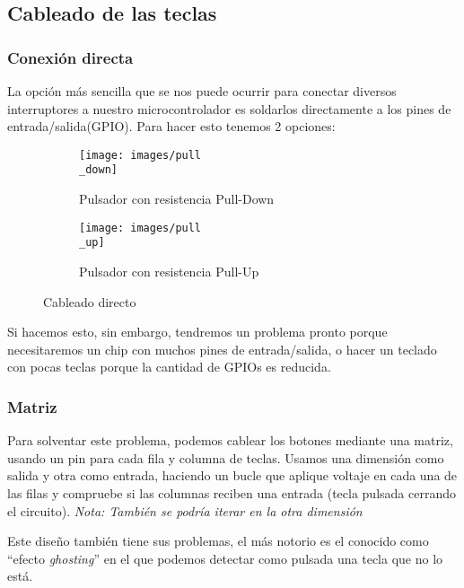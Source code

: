 \subsection{Cableado de las teclas}\label{sec:scanning}
    \subsubsection{Conexión directa}
    La opción más sencilla que se nos puede ocurrir para conectar diversos interruptores a nuestro microcontrolador es soldarlos directamente a los pines de entrada/salida(GPIO). Para hacer esto tenemos 2 opciones:
    \begin{figure}[H]
        \begin{subfigure}[b]{.5\textwidth}
          \centering
          \texttt{[image: images/pull\\\_down]}
          \caption{Pulsador con resistencia Pull-Down}
        \end{subfigure} 
        \hfill
        \begin{subfigure}[b]{.5\textwidth}
          \centering
          \texttt{[image: images/pull\\\_up]}
          \caption{Pulsador con resistencia Pull-Up}
        \end{subfigure}
        \caption{Cableado directo}
      \end{figure}
    
    Si hacemos esto, sin embargo, tendremos un problema pronto porque necesitaremos un chip con muchos pines de entrada/salida, o hacer un teclado con pocas teclas porque la cantidad de GPIOs es reducida.

    \subsubsection{Matriz}
    Para solventar este problema, podemos cablear los botones mediante una matriz, usando un pin para cada fila y columna de teclas. Usamos una dimensión como salida y otra como entrada, haciendo un bucle que aplique voltaje en cada una de las filas y compruebe si las columnas reciben una entrada (tecla pulsada cerrando el circuito). \emph{Nota: También se podría iterar en la otra dimensión}

    Este diseño también tiene sus problemas, el más notorio es el conocido como ``efecto \textit{ghosting}'' en el que podemos detectar como pulsada una tecla que no lo está.


